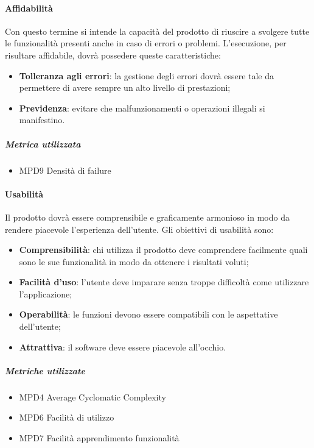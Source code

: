 \paragraph{Affidabilità}
Con questo termine si intende la capacità del prodotto di riuscire a svolgere tutte le funzionalità presenti anche in caso di errori o problemi. L'esecuzione, per risultare affidabile, dovrà possedere queste caratteristiche:
\begin{itemize}
\item \textbf{Tolleranza agli errori}: la gestione degli errori dovrà essere tale da permettere di avere sempre un alto livello di prestazioni;
\item \textbf{Previdenza}: evitare che malfunzionamenti o operazioni illegali si manifestino.
\end{itemize}
\subparagraph{Metrica utilizzata}
\begin{itemize}
\item MPD9 Densità di failure
\end{itemize}
\paragraph{Usabilità}
Il prodotto dovrà essere comprensibile e graficamente armonioso in modo da rendere piacevole l'esperienza dell'utente. Gli obiettivi di usabilità sono:
\begin{itemize}
\item \textbf{Comprensibilità}: chi utilizza il prodotto deve comprendere facilmente quali sono le sue funzionalità in modo da ottenere i risultati voluti;
\item \textbf{Facilità d'uso}: l'utente deve imparare senza troppe difficoltà come utilizzare l'applicazione;
\item \textbf{Operabilità}: le funzioni devono essere compatibili con le aspettative dell'utente;
\item \textbf{Attrattiva}: il software deve essere piacevole all'occhio.
\end{itemize} 
\subparagraph{Metriche utilizzate}
\begin{itemize}
\item MPD4 Average Cyclomatic Complexity
\item MPD6 Facilità di utilizzo
\item MPD7 Facilità apprendimento funzionalità
\end{itemize}
